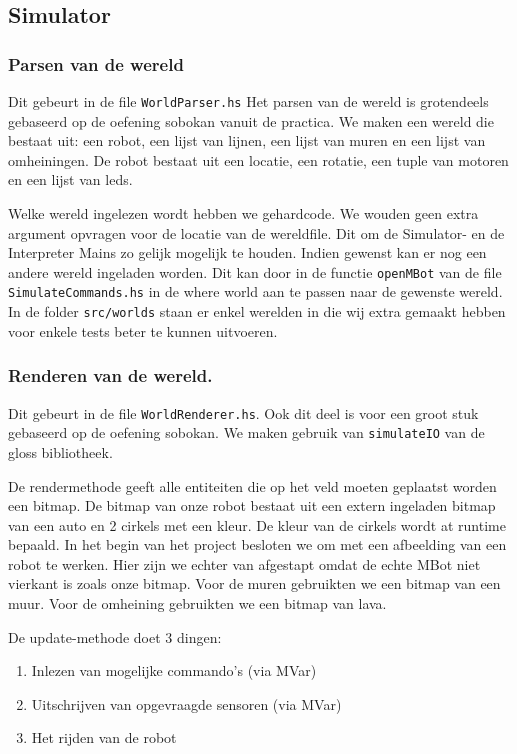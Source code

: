 \documentclass[12pt, titlepage]{article}
\begin{document}
\subsection{Simulator}

\subsubsection{Parsen van de wereld}
\label{ssub:parsen_van_de_wereld}
Dit gebeurt in de file \texttt{WorldParser.hs} 
Het parsen van de wereld is grotendeels gebaseerd op de oefening sobokan vanuit de practica.
We maken een wereld die bestaat uit: een robot, een lijst van lijnen, een lijst van muren en een lijst van omheiningen.
De robot bestaat uit een locatie, een rotatie, een tuple van motoren en een lijst van leds.

Welke wereld ingelezen wordt hebben we gehardcode. We wouden geen extra argument opvragen voor de locatie van de wereldfile. Dit om de Simulator- en de Interpreter Mains zo gelijk mogelijk te houden.
Indien gewenst kan er nog een andere wereld ingeladen worden. Dit kan door in de functie \texttt{openMBot} van de file \texttt{SimulateCommands.hs} in de where world aan te passen naar de gewenste wereld. 
In de folder \texttt{src/worlds} staan er enkel werelden in die wij extra gemaakt hebben voor enkele tests beter te kunnen uitvoeren.

\subsubsection{Renderen van de wereld.}
\label{ssub:renderen_van_de_wereld_}
Dit gebeurt in de file \texttt{WorldRenderer.hs}.
Ook dit deel is voor een groot stuk gebaseerd op de oefening sobokan.
We maken gebruik van \texttt{simulateIO} van de gloss bibliotheek.

De rendermethode geeft alle entiteiten die op het veld moeten geplaatst worden een bitmap. 
De bitmap van onze robot bestaat uit een extern ingeladen bitmap van een auto en 2 cirkels met een kleur. 
De kleur van de cirkels wordt at runtime bepaald.
In het begin van het project besloten we om met een afbeelding van een robot te werken. Hier zijn we echter van afgestapt omdat de echte MBot niet vierkant is zoals onze bitmap.
Voor de muren gebruikten we een bitmap van een muur.
Voor de omheining gebruikten we een bitmap van lava.

De update-methode doet 3 dingen:
\begin{enumerate}
    \item Inlezen van mogelijke commando's (via MVar)
    \item Uitschrijven van opgevraagde sensoren (via MVar)
    \item Het rijden van de robot
\end{enumerate}
\end{document}
